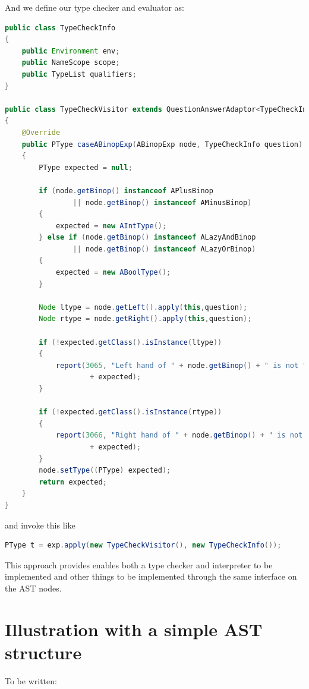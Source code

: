 \documentclass{overturerep}
\begin{document}
And we define our type checker and evaluator as:
\begin{lstlisting}[language=java]
public class TypeCheckInfo
{
	public Environment env;
	public NameScope scope;
	public TypeList qualifiers;
}

public class TypeCheckVisitor extends QuestionAnswerAdaptor<TypeCheckInfo, PType>
{
	@Override
	public PType caseABinopExp(ABinopExp node, TypeCheckInfo question)
	{
		PType expected = null;

		if (node.getBinop() instanceof APlusBinop
				|| node.getBinop() instanceof AMinusBinop)
		{
			expected = new AIntType();
		} else if (node.getBinop() instanceof ALazyAndBinop
				|| node.getBinop() instanceof ALazyOrBinop)
		{
			expected = new ABoolType();
		}

		Node ltype = node.getLeft().apply(this,question);
		Node rtype = node.getRight().apply(this,question);

		if (!expected.getClass().isInstance(ltype))
		{
			report(3065, "Left hand of " + node.getBinop() + " is not "
					+ expected);
		}

		if (!expected.getClass().isInstance(rtype))
		{
			report(3066, "Right hand of " + node.getBinop() + " is not "
					+ expected);
		}
		node.setType((PType) expected);
		return expected;
	}
}
\end{lstlisting}

and invoke this like

\begin{lstlisting}[language=java]
PType t = exp.apply(new TypeCheckVisitor(), new TypeCheckInfo());
\end{lstlisting}

This approach provides enables both a type checker and interpreter to be implemented and other things to be implemented through the same interface on the AST nodes.


\section{Illustration with a simple AST structure}
To be written:
\end{document}

